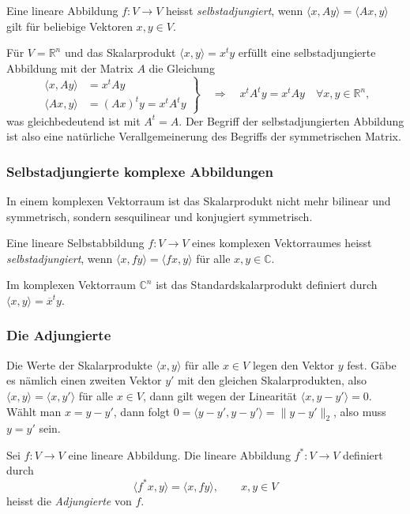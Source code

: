\begin{definition}
Eine lineare Abbildung $f\colon V\to V$ heisst {\em selbstadjungiert}, wenn
$\langle x,Ay\rangle=\langle Ax,y\rangle$ gilt für beliebige 
Vektoren $x,y\in V$.
%
\end{definition}

Für $V=\mathbb{R}^n$ und das Skalarprodukt $\langle x,y\rangle=x^ty$ 
erfüllt eine selbstadjungierte Abbildung mit der Matrix $A$ die Gleichung
\[
\left.
\begin{aligned}
\langle x,Ay\rangle
&=
x^tAy
\\
\langle Ax,y\rangle
&=
(Ax)^ty=x^tA^ty
\end{aligned}
\right\}
\quad\Rightarrow\quad
x^tA^ty = x^tAy\quad\forall x,y\in\mathbb{R}^n,
\]
was gleichbedeutend ist mit $A^t=A$.
Der Begriff der selbstadjungierten Abbildung ist also eine natürliche
Verallgemeinerung des Begriffs der symmetrischen Matrix.

\subsubsection{Selbstadjungierte komplexe Abbildungen}
In einem komplexen Vektorraum ist das Skalarprodukt nicht mehr bilinear
und symmetrisch, sondern sesquilinear und konjugiert symmetrisch.

\begin{definition}
Eine lineare Selbstabbildung $f\colon V\to V$  eines komplexen
Vektorraumes heisst {\em selbstadjungiert},
wenn $\langle x,fy\rangle=\langle fx,y\rangle$ für alle $x,y\in\mathbb{C}$.
%
\end{definition}

Im komplexen Vektorraum $\mathbb{C}^n$ ist das Standardskalarprodukt
definiert durch $\langle x,y\rangle = \overline{x}^ty$.

\subsubsection{Die Adjungierte}
Die Werte der Skalarprodukte $\langle x, y\rangle$ für alle $x\in V$
legen den Vektor $y$ fest.
Gäbe es nämlich einen zweiten Vektor $y'$ mit den gleichen Skalarprodukten,
also $\langle x,y\rangle = \langle x,y'\rangle$ für alle $x\in V$,
dann gilt wegen der Linearität $\langle x,y-y'\rangle=0$.
Wählt man $x=y-y'$, dann folgt
$0=\langle y-y',y-y'\rangle=\|y-y'\|_2$, also muss $y=y'$ sein.

\begin{definition}
Sei $f\colon V\to V$ eine lineare Abbildung.
Die lineare Abbildung $f^*\colon V\to V$ definiert durch
\[
\langle f^*x,y\rangle = \langle x,fy\rangle,\qquad x,y\in V
\]
heisst die {\em Adjungierte} von $f$.
%
\end{definition}

